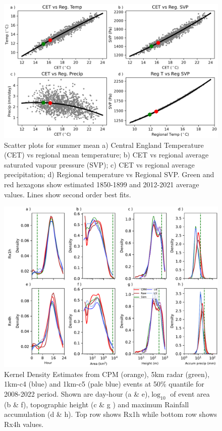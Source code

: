 \documentclass[11pt,a4paper]{article}
\begin{document}
\begin{figure}[tp]
	\centering
	\includegraphics[width=\linewidth]{scatter.png}
	\caption{Scatter plots for summer mean  a)  Central England Temperature (CET) vs  regional mean temperature; b) CET vs regional average saturated vapour pressure (SVP); c) CET vs regional average precipitation; d) Regional temperature vs Regional SVP. Green and red hexagons show estimated 1850-1899 and 2012-2021 average values. Lines show second order best fits.}
	\label{fig:cet_scatter}
\end{figure}



\begin{figure}
	\centering
	\includegraphics[width=\linewidth]{kde_smooth_events}
	\caption{Kernel Density Estimates from  CPM (orange), 5km radar (green), 1km-c4 (blue) and 1km-c5 (pale blue) events at 50\% quantile for 2008-2022 period. Shown are day-hour (a \& e),$\log_{10}$ of event area (b \& f),  topographic height (c \& g ) and maximum Rainfall accumulation (d \& h). Top row shows Rx1h while bottom row shows Rx4h values.}
	\end{figure}
\end{document}
